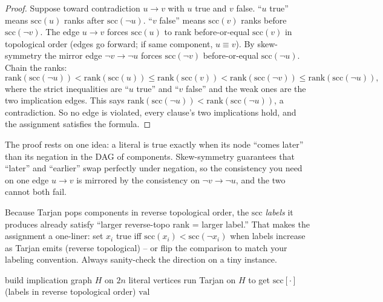 \begin{proof}
Suppose toward contradiction $u\to v$ with $u$ true and $v$ false. ``$u$ true'' means $\mathrm{scc}(u)$ ranks after $\mathrm{scc}(\lnot u)$. ``$v$ false'' means $\mathrm{scc}(v)$ ranks before $\mathrm{scc}(\lnot v)$. The edge $u\to v$ forces $\mathrm{scc}(u)$ to rank before-or-equal $\mathrm{scc}(v)$ in topological order (edges go forward; if same component, $u\equiv v$). By skew-symmetry the mirror edge $\lnot v\to\lnot u$ forces $\mathrm{scc}(\lnot v)$ before-or-equal $\mathrm{scc}(\lnot u)$. Chain the ranks:
\[
\mathrm{rank}(\mathrm{scc}(\lnot u)) < \mathrm{rank}(\mathrm{scc}(u)) \le \mathrm{rank}(\mathrm{scc}(v)) < \mathrm{rank}(\mathrm{scc}(\lnot v)) \le \mathrm{rank}(\mathrm{scc}(\lnot u)),
\]
where the strict inequalities are ``$u$ true'' and ``$v$ false'' and the weak ones are the two implication edges. This says $\mathrm{rank}(\mathrm{scc}(\lnot u)) < \mathrm{rank}(\mathrm{scc}(\lnot u))$, a contradiction. So no edge is violated, every clause's two implications hold, and the assignment satisfies the formula.
\end{proof}

\begin{whybox}
The proof rests on one idea: a literal is true exactly when its node ``comes later'' than its negation in the DAG of components. Skew-symmetry guarantees that ``later'' and ``earlier'' swap perfectly under negation, so the consistency you need on one edge $u\to v$ is mirrored by the consistency on $\lnot v\to\lnot u$, and the two cannot both fail.
\end{whybox}

Because Tarjan pops components in reverse topological order, the $\mathrm{scc}$ \emph{labels} it produces already satisfy ``larger reverse-topo rank = larger label.'' That makes the assignment a one-liner: set $x_i$ true iff $\mathrm{scc}(x_i) < \mathrm{scc}(\lnot x_i)$ when labels increase as Tarjan emits (reverse topological) -- or flip the comparison to match your labeling convention. Always sanity-check the direction on a tiny instance.

\begin{algorithm}[H]
\caption{2-SAT solver}
\label{ch05:alg-2sat}
\DontPrintSemicolon
{}
build implication graph $H$ on $2n$ literal vertices\;
run Tarjan on $H$ to get $\mathrm{scc}[\cdot]$ (labels in reverse topological order)\;
\Return $\mathrm{val}$\;
\end{algorithm}

